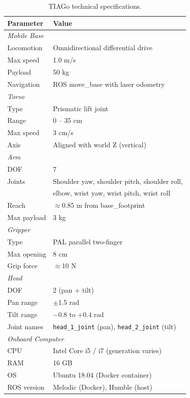 \begin{table}[H]
\centering
\caption{TIAGo technical specifications.}
\label{tab:tiago_specs}
\begin{tabular}{ll}
\toprule
\textbf{Parameter} & \textbf{Value} \\
\midrule
\multicolumn{2}{l}{\textit{Mobile Base}} \\
Locomotion     & Omnidirectional differential drive \\
Max speed      & 1.0 m/s \\
Payload        & 50 kg \\
Navigation     & ROS move\_base with laser odometry \\
\midrule
\multicolumn{2}{l}{\textit{Torso}} \\
Type           & Prismatic lift joint \\
Range          & 0 -- 35 cm \\
Max speed      & 3 cm/s \\
Axis           & Aligned with world Z (vertical) \\
\midrule
\multicolumn{2}{l}{\textit{Arm}} \\
DOF            & 7 \\
Joints         & Shoulder yaw, shoulder pitch, shoulder roll, \\
               & elbow, wrist yaw, wrist pitch, wrist roll \\
Reach          & $\approx$0.85 m from base\_footprint \\
Max payload    & 3 kg \\
\midrule
\multicolumn{2}{l}{\textit{Gripper}} \\
Type           & PAL parallel two-finger \\
Max opening    & 8 cm \\
Grip force     & $\approx$10 N \\
\midrule
\multicolumn{2}{l}{\textit{Head}} \\
DOF            & 2 (pan + tilt) \\
Pan range      & $\pm$1.5 rad \\
Tilt range     & $-0.8$ to $+0.4$ rad \\
Joint names    & \texttt{head\_1\_joint} (pan), \texttt{head\_2\_joint} (tilt) \\
\midrule
\multicolumn{2}{l}{\textit{Onboard Computer}} \\
CPU            & Intel Core i5 / i7 (generation varies) \\
RAM            & 16 GB \\
OS             & Ubuntu 18.04 (Docker container) \\
ROS version    & Melodic (Docker), Humble (host) \\
\bottomrule
\end{tabular}
\end{table}


